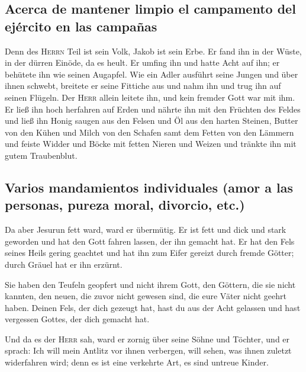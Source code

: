 \hypertarget{acerca-de-mantener-limpio-el-campamento-del-ejuxe9rcito-en-las-campauxf1as}{%
\subsection{Acerca de mantener limpio el campamento del ejército en las
campañas}\label{acerca-de-mantener-limpio-el-campamento-del-ejuxe9rcito-en-las-campauxf1as}}

 Denn des \textsc{Herrn} Teil ist sein Volk, Jakob ist
sein Erbe.  Er fand ihn in der Wüste, in der dürren
Einöde, da es heult. Er umfing ihn und hatte Acht auf ihn; er behütete
ihn wie seinen Augapfel.  Wie ein Adler ausführt seine
Jungen und über ihnen schwebt, breitete er seine Fittiche aus und nahm
ihn und trug ihn auf seinen Flügeln.  Der \textsc{Herr}
allein leitete ihn, und kein fremder Gott war mit ihm. 
Er ließ ihn hoch herfahren auf Erden und nährte ihn mit den Früchten des
Feldes und ließ ihn Honig saugen aus den Felsen und Öl aus den harten
Steinen,  Butter von den Kühen und Milch von den Schafen
samt dem Fetten von den Lämmern und feiste Widder und Böcke mit fetten
Nieren und Weizen und tränkte ihn mit gutem Traubenblut.

\hypertarget{varios-mandamientos-individuales-amor-a-las-personas-pureza-moral-divorcio-etc.}{%
\subsection{Varios mandamientos individuales (amor a las personas,
pureza moral, divorcio,
etc.)}\label{varios-mandamientos-individuales-amor-a-las-personas-pureza-moral-divorcio-etc.}}

 Da aber Jesurun fett ward, ward er übermütig. Er ist
fett und dick und stark geworden und hat den Gott fahren lassen, der ihn
gemacht hat. Er hat den Fels seines Heils gering geachtet
 und hat ihn zum Eifer gereizt durch fremde Götter; durch
Gräuel hat er ihn erzürnt.

 Sie haben den Teufeln geopfert und nicht ihrem Gott, den
Göttern, die sie nicht kannten, den neuen, die zuvor nicht gewesen sind,
die eure Väter nicht geehrt haben.  Deinen Fels, der dich
gezeugt hat, hast du aus der Acht gelassen und hast vergessen Gottes,
der dich gemacht hat.

 Und da es der \textsc{Herr} sah, ward er zornig über
seine Söhne und Töchter,  und er sprach: Ich will mein
Antlitz vor ihnen verbergen, will sehen, was ihnen zuletzt widerfahren
wird; denn es ist eine verkehrte Art, es sind untreue Kinder.

